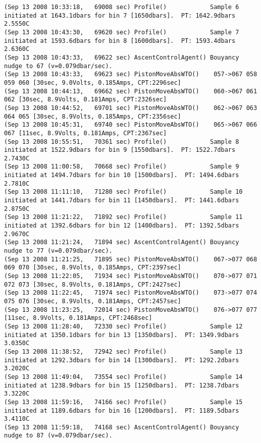 {\begin{verbatim}
(Sep 13 2008 10:33:18,   69008 sec) Profile()            Sample 6 initiated at 1643.1dbars for bin 7 [1650dbars].  PT: 1642.9dbars 2.5550C
(Sep 13 2008 10:43:30,   69620 sec) Profile()            Sample 7 initiated at 1593.6dbars for bin 8 [1600dbars].  PT: 1593.4dbars 2.6360C
(Sep 13 2008 10:43:33,   69622 sec) AscentControlAgent() Bouyancy nudge to 67 (v=0.079dbar/sec).
(Sep 13 2008 10:43:33,   69623 sec) PistonMoveAbsWTO()    057->067 058 059 060 [30sec, 9.0Volts, 0.185Amps, CPT:2296sec]
(Sep 13 2008 10:44:13,   69662 sec) PistonMoveAbsWTO()    060->067 061 062 [30sec, 8.9Volts, 0.181Amps, CPT:2326sec]
(Sep 13 2008 10:44:52,   69701 sec) PistonMoveAbsWTO()    062->067 063 064 065 [30sec, 8.9Volts, 0.185Amps, CPT:2356sec]
(Sep 13 2008 10:45:31,   69740 sec) PistonMoveAbsWTO()    065->067 066 067 [11sec, 8.9Volts, 0.181Amps, CPT:2367sec]
(Sep 13 2008 10:55:51,   70361 sec) Profile()            Sample 8 initiated at 1522.9dbars for bin 9 [1550dbars].  PT: 1522.7dbars 2.7430C
(Sep 13 2008 11:00:58,   70668 sec) Profile()            Sample 9 initiated at 1494.7dbars for bin 10 [1500dbars].  PT: 1494.6dbars 2.7810C
(Sep 13 2008 11:11:10,   71280 sec) Profile()            Sample 10 initiated at 1441.7dbars for bin 11 [1450dbars].  PT: 1441.6dbars 2.8750C
(Sep 13 2008 11:21:22,   71892 sec) Profile()            Sample 11 initiated at 1392.6dbars for bin 12 [1400dbars].  PT: 1392.5dbars 2.9670C
(Sep 13 2008 11:21:24,   71894 sec) AscentControlAgent() Bouyancy nudge to 77 (v=0.079dbar/sec).
(Sep 13 2008 11:21:25,   71895 sec) PistonMoveAbsWTO()    067->077 068 069 070 [30sec, 8.9Volts, 0.185Amps, CPT:2397sec]
(Sep 13 2008 11:22:05,   71934 sec) PistonMoveAbsWTO()    070->077 071 072 073 [30sec, 8.9Volts, 0.181Amps, CPT:2427sec]
(Sep 13 2008 11:22:45,   71974 sec) PistonMoveAbsWTO()    073->077 074 075 076 [30sec, 8.9Volts, 0.181Amps, CPT:2457sec]
(Sep 13 2008 11:23:25,   72014 sec) PistonMoveAbsWTO()    076->077 077 [11sec, 8.9Volts, 0.181Amps, CPT:2468sec]
(Sep 13 2008 11:28:40,   72330 sec) Profile()            Sample 12 initiated at 1350.1dbars for bin 13 [1350dbars].  PT: 1349.9dbars 3.0350C
(Sep 13 2008 11:38:52,   72942 sec) Profile()            Sample 13 initiated at 1292.3dbars for bin 14 [1300dbars].  PT: 1292.2dbars 3.2020C
(Sep 13 2008 11:49:04,   73554 sec) Profile()            Sample 14 initiated at 1238.9dbars for bin 15 [1250dbars].  PT: 1238.7dbars 3.3220C
(Sep 13 2008 11:59:16,   74166 sec) Profile()            Sample 15 initiated at 1189.6dbars for bin 16 [1200dbars].  PT: 1189.5dbars 3.4110C
(Sep 13 2008 11:59:18,   74168 sec) AscentControlAgent() Bouyancy nudge to 87 (v=0.079dbar/sec).

\end{verbatim}}
